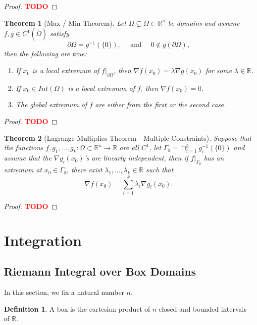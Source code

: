 \documentclass{article}
\theoremstyle{plain}
\newtheorem{theorem}{Theorem}[subsection]
\theoremstyle{definition}
\newtheorem*{definition}{Definition}
\newcommand{\R}{\mathbb{R}}
\newcommand{\td}{\textcolor{red}{\textbf{TODO}}}
\begin{document}
\begin{proof}
    \td 
\end{proof}

\begin{theorem}[Max / Min Theorem]
    Let $\Omega \subsetneq \tilde\Omega \subset \R^n$ be domains and assume $f,g \in C^1(\tilde\Omega)$ satisfy
    $$\partial \Omega = g^{-1}(\{0\}), \quad \text{ and } \quad 0 \notin g(\partial \Omega),$$
    then the following are true:
    \begin{enumerate}
        \item If $x_0$ is a local extremum of $f|_{\partial \Omega}$, then $\nabla f (x_0) = \lambda \nabla g(x_0)$ for some $\lambda \in \R$.
        \item If $x_0 \in Int(\Omega)$ is a local extremum of $f$, then $\nabla f(x_0) = 0$.
        \item The global extremum of $f$ are either from the first or the second case.
    \end{enumerate}
\end{theorem}

\begin{proof}
    \td 
\end{proof}

\begin{theorem}[Lagrange Multiplies Theorem - Multiple Constraints]
    Suppose that the functions $f,g_1, ..., g_k : \Omega \subset \R^n \to \R$ are all $C^1$, let $\Gamma_0 = \cap_{i=1}^k g_i^{-1}(\{0\})$ and assume that the $\nabla g_i (x_0)$'s are linearly independent, then if $f|_{\Gamma_0}$ has an extremum at $x_0 \in \Gamma_0$, there exist $\lambda_1, ..., \lambda_k \in \R$ such that
    $$\nabla f(x_0) = \sum_{i=1}^{k}\lambda_i \nabla g_i(x_0).$$
\end{theorem}

\begin{proof}
    \td
\end{proof}

\section{Integration}

\subsection{Riemann Integral over Box Domains}

In this section, we fix a natural number $n$.

\begin{definition}
    A box is the cartesian product of $n$ closed and bounded intervals of $\R$.
\end{definition}
\end{document}
